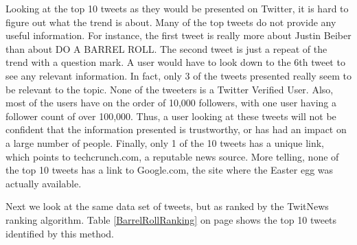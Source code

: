 \documentclass[10pt]{proc}
\begin{document}
    Looking at the top 10 tweets as they would be presented on Twitter, it is hard to figure out what the trend is about. Many of the top tweets do not provide any useful information. For instance, the first tweet is really more about Justin Beiber than about DO A BARREL ROLL. The second tweet is just a repeat of the trend with a question mark. A user would have to look down to the 6th tweet to see any relevant information. In fact, only 3 of the tweets presented really seem to be relevant to the topic. None of the tweeters is a Twitter Verified User. Also, most of the users have on the order of 10,000 followers, with one user having a follower count of over 100,000. Thus, a user looking at these tweets will not be confident that the information presented is trustworthy, or has had an impact on a large number of people. Finally, only 1 of the 10 tweets has a unique link, which points to techcrunch.com, a reputable news source. More telling, none of the top 10 tweets has a link to Google.com, the site where the Easter egg was actually available.

    Next we look at the same data set of tweets, but as ranked by the TwitNews ranking algorithm. Table \ref{BarrelRollRanking} on page \pageref{BarrelRollRanking} shows the top 10 tweets identified by this method.
\end{document}
